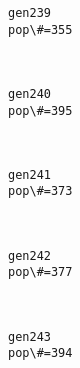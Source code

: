 \documentclass[11pt]{article}
\begin{document}
    \begin{Verbatim}[commandchars=\\\{\}]
gen239
pop\#=355

    \end{Verbatim}

    \begin{center}
    \end{center}
    { \hspace*{\fill} \\}
    
    \begin{Verbatim}[commandchars=\\\{\}]
gen240
pop\#=395

    \end{Verbatim}

    \begin{center}
    \end{center}
    { \hspace*{\fill} \\}
    
    \begin{Verbatim}[commandchars=\\\{\}]
gen241
pop\#=373

    \end{Verbatim}

    \begin{center}
    \end{center}
    { \hspace*{\fill} \\}
    
    \begin{Verbatim}[commandchars=\\\{\}]
gen242
pop\#=377

    \end{Verbatim}

    \begin{center}
    \end{center}
    { \hspace*{\fill} \\}
    
    \begin{Verbatim}[commandchars=\\\{\}]
gen243
pop\#=394

    \end{Verbatim}
\end{document}
